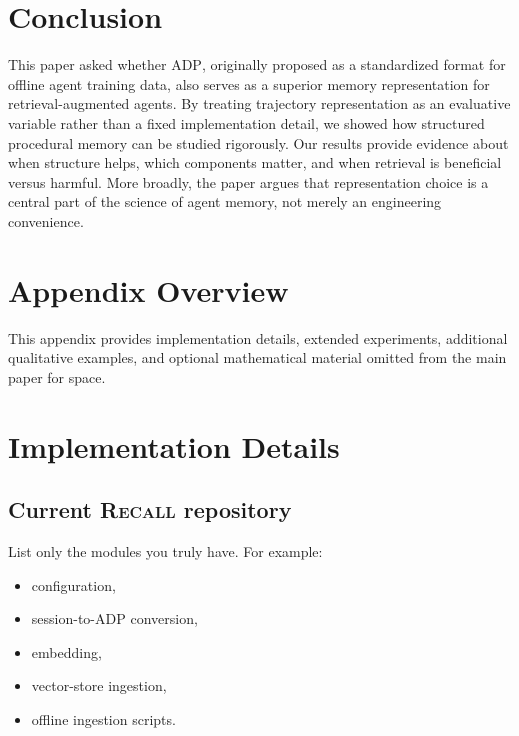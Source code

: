 \documentclass{article}
\newcommand{\Recall}{\textsc{Recall}}
\newcommand{\ADP}{\textsc{ADP}}
\begin{document}
\section{Conclusion}
This paper asked whether \ADP{}, originally proposed as a standardized format for offline agent
training data, also serves as a superior memory representation for retrieval-augmented agents.
By treating trajectory representation as an evaluative variable rather than a fixed implementation detail,
we showed how structured procedural memory can be studied rigorously.
Our results provide evidence about when structure helps, which components matter, and when retrieval is
beneficial versus harmful.
More broadly, the paper argues that representation choice is a central part of the science of agent
memory, not merely an engineering convenience.




\appendix

\section{Appendix Overview}
This appendix provides implementation details, extended experiments, additional qualitative examples,
and optional mathematical material omitted from the main paper for space.

\section{Implementation Details}
\subsection{Current \Recall{} repository}
List only the modules you truly have.
For example:
\begin{itemize}[leftmargin=*,itemsep=2pt,topsep=2pt]
    \item configuration,
    \item session-to-\ADP{} conversion,
    \item embedding,
    \item vector-store ingestion,
    \item offline ingestion scripts.
\end{itemize}
\end{document}
